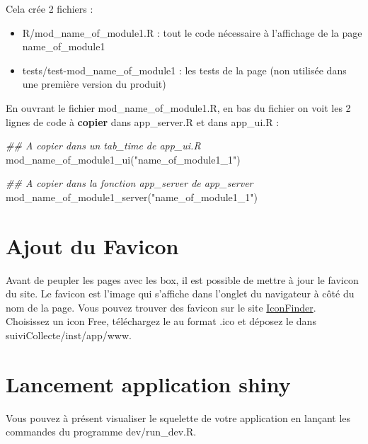 \documentclass[
  letterpaper,
  DIV=11,
  numbers=noendperiod]{scrreprt}
\newenvironment{Shaded}{\begin{snugshade}}{\end{snugshade}}
\newcommand{\DocumentationTok}[1]{\textcolor[rgb]{0.37,0.37,0.37}{\textit{#1}}}
\newcommand{\FunctionTok}[1]{\textcolor[rgb]{0.28,0.35,0.67}{#1}}
\newcommand{\NormalTok}[1]{\textcolor[rgb]{0.00,0.23,0.31}{#1}}
\newcommand{\StringTok}[1]{\textcolor[rgb]{0.13,0.47,0.30}{#1}}
\providecommand{\tightlist}{%
  \setlength{\itemsep}{0pt}\setlength{\parskip}{0pt}}\usepackage{longtable,booktabs,array}
\begin{document}
Cela crée 2 fichiers :

\begin{itemize}
\tightlist
\item
  R/mod\_name\_of\_module1.R : tout le code nécessaire à l'affichage de
  la page name\_of\_module1
\item
  tests/test-mod\_name\_of\_module1 : les tests de la page (non utilisée
  dans une première version du produit)
\end{itemize}

En ouvrant le fichier mod\_name\_of\_module1.R, en bas du fichier on
voit les 2 lignes de code à \textbf{copier} dans app\_server.R et dans
app\_ui.R :

\begin{Shaded}
\begin{Highlighting}[]
\DocumentationTok{\#\# A copier dans un tab\_time de app\_ui.R }
\FunctionTok{mod\_name\_of\_module1\_ui}\NormalTok{(}\StringTok{"name\_of\_module1\_1"}\NormalTok{)}
    
\DocumentationTok{\#\# A copier dans la fonction app\_server de app\_server }
\FunctionTok{mod\_name\_of\_module1\_server}\NormalTok{(}\StringTok{"name\_of\_module1\_1"}\NormalTok{)}
\end{Highlighting}
\end{Shaded}

\hypertarget{ajout-du-favicon}{%
\section{Ajout du Favicon}\label{ajout-du-favicon}}

Avant de peupler les pages avec les box, il est possible de mettre à
jour le favicon du site. Le favicon est l'image qui s'affiche dans
l'onglet du navigateur à côté du nom de la page. Vous pouvez trouver des
favicon sur le site \href{https://www.iconfinder.com/}{IconFinder}.
Choisissez un icon Free, téléchargez le au format .ico et déposez le
dans suiviCollecte/inst/app/www.

\hypertarget{lancement-application-shiny}{%
\section{Lancement application
shiny}\label{lancement-application-shiny}}

Vous pouvez à présent visualiser le squelette de votre application en
lançant les commandes du programme dev/run\_dev.R.
\end{document}
